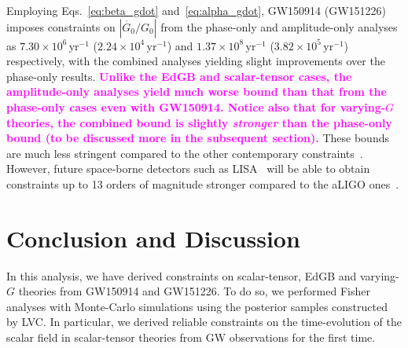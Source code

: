 \documentclass[prd,twocolumn,nofootinbib]{revtex4-1}
\newcommand{\kent}[1]{\textcolor{magenta}{\textbf{#1}} }
\begin{document}
Employing Eqs.~\eqref{eq:beta_gdot} and~\eqref{eq:alpha_gdot}, GW150914 (GW151226) imposes constraints on $|\dot{G_0}/G_0|$ from the phase-only and amplitude-only analyses as $7.30\times10^6\, \mathrm{yr}^{-1}$ ($2.24\times10^4\, \mathrm{yr}^{-1}$) and $1.37\times10^8\, \mathrm{yr}^{-1}$ ($3.82\times10^5\, \mathrm{yr}^{-1}$) respectively, with the combined analyses yielding slight improvements over the phase-only results.
\kent{Unlike the EdGB and scalar-tensor cases, the amplitude-only analyses yield much worse bound than that from the phase-only cases even with GW150914. Notice also that for varying-$G$ theories, the combined bound is slightly \emph{stronger} than the phase-only bound (to be discussed more in the subsequent section).} 
These bounds are much less stringent compared to the other contemporary constraints~\cite{Will2006}. 
However, future space-borne detectors such as LISA~\cite{Seoane:2013qna,Audley:2017drz} will be able to obtain constraints up to 13 orders of magnitude stronger compared to  the aLIGO ones~\cite{Yunes:2009bv,Chamberlain:2017fjl}.


\section{Conclusion and Discussion}\label{conclusion}
In this analysis, we have derived constraints on scalar-tensor, EdGB and varying-$G$ theories from GW150914 and GW151226. To do so, we performed Fisher analyses with Monte-Carlo simulations using the posterior samples constructed by LVC.
In particular, we derived reliable constraints on the time-evolution of the scalar field in scalar-tensor theories from GW observations for the first time. 
\end{document}
